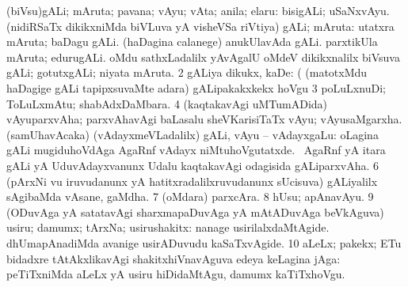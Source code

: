 \bentry
{} 
\gl{\nA}
\expl{}
\bmng
\bnum
{} 
\banum
{} (biVsu)gALi; mAruta; pavana; vAyu; vAta; anila; elaru:  bisigALi; uSaNxvAyu. 
 (nidiRSaTx dikikxniMda biVLuva yA visheVSa riVtiya) gALi; mAruta:  utatxra mAruta; baDagu gALi.  (haDagina calanege) anukUlavAda gALi.  parxtikUla mAruta; edurugALi.  oMdu sathxLadalilx yAvAgalU oMdeV dikikxnalilx biVsuva gALi; gotutxgALi; niyata mAruta. 
\eanum
\numie
\num{2} gALiya dikukx, kaDe:  (  (matotxMdu haDagige gALi tapipxsuvaMte adara) gALipakakxkekx hoVgu 
\num{3} poLuLxnuDi; ToLuLxmAtu; shabAdxDaMbara. 
\num{4} (kaqtakavAgi uMTumADida) vAyuparxvAha; parxvAhavAgi baLasalu sheVKarisiTaTx vAyu; vAyusaMgarxha. 
\banum
{} (samUhavAcaka) (vAdayxmeVLadalilx) gALi, vAyu -- vAdayxgaLu:  oLagina gALi mugiduhoVdAga AgaRnf vAdayx niMtuhoVgutatxde. 
 \kanmu\ AgaRnf yA itara gALi yA UduvAdayxvanunx Udalu kaqtakavAgi odagisida gALiparxvAha. 
\eanum
\numie
\num{6} (pArxNi \mo vu iruvudanunx yA hatitxradalilxruvudanunx sUcisuva) gALiyalilx sAgibaMda vAsane, gaMdha. 
\num{7} (oMdara) parxcAra. 
\num{8} hUsu; apAnavAyu. 
\num{9} (ODuvAga yA satatavAgi sharxmapaDuvAga yA mAtADuvAga beVkAguva) usiru; damumx; tArxNa; usirushakitx:  nanage usirilalxdaMtAgide.  dhUmapAnadiMda avanige usirADuvudu kaSaTxvAgide. 
\num{10} aLeLx; pakekx; ETu bidadxre tAtAkxlikavAgi shakitxhiVnavAguva edeya keLagina jAga:  peTiTxniMda aLeLx yA usiru hiDidaMtAgu, damumx kaTiTxhoVgu. 
\enum
\emng

